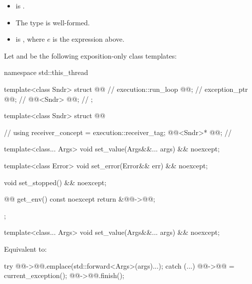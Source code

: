 \pnum
\mandates
\begin{itemize}
\item
{} is .
\item
The type  is well-formed.
\item
{}
is , where $e$ is the  expression above.
\end{itemize}

\pnum
Let  and 
be the following exposition-only class templates:
\begin{codeblock}
namespace std::this_thread {
  template<class Sndr>
  struct @@ {                                      // \expos
    execution::run_loop @@;                                   // \expos
    exception_ptr @@;                                        // \expos
    @@<Sndr> @@;                         // \expos
  };

  template<class Sndr>
  struct @@ {                                   // \expos
    using receiver_concept = execution::receiver_tag;
    @@<Sndr>* @@;                               // \expos

    template<class... Args>
    void set_value(Args&&... args) && noexcept;

    template<class Error>
    void set_error(Error&& err) && noexcept;

    void set_stopped() && noexcept;

    @@ get_env() const noexcept { return {&@@->@@}; }
  };
}
\end{codeblock}

\begin{itemdecl}
template<class... Args>
void set_value(Args&&... args) && noexcept;
\end{itemdecl}

\begin{itemdescr}
\pnum
\effects
Equivalent to:
\begin{codeblock}
try {
  @@->@@.emplace(std::forward<Args>(args)...);
} catch (...) {
  @@->@@ = current_exception();
}
@@->@@.finish();
\end{codeblock}
\end{itemdescr}

